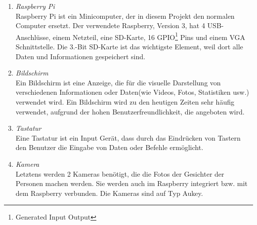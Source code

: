 \begin{enumerate}
	\item \textit{Raspberry Pi} \\
	Raspberry Pi ist ein Minicomputer, der in diesem Projekt den normalen Computer ersetzt. Der verwendete Raspberry, Version 3, hat 4 USB-Anschlüsse, einem Netzteil, eine SD-Karte, 16 GPIO\footnote{Generated Input Output} Pins und einem VGA Schnittstelle. Die 3.-Bit SD-Karte ist das wichtigste Element, weil dort alle Daten und Informationen gespeichert sind.
	\item \textit{Bildschirm} \\
	Ein Bildschirm ist eine Anzeige, die für die visuelle Darstellung von verschiedenen Informationen oder Daten(wie Videos, Fotos, Statistiken usw.) verwendet wird. Ein Bildschirm wird zu den heutigen Zeiten sehr häufig verwendet, aufgrund der hohen Benutzerfreundlichkeit, die angeboten wird.
	\item \textit{Tastatur} \\
	Eine Tastatur ist ein Input Gerät, dass durch das Eindrücken von Tastern den Benutzer die Eingabe von Daten oder Befehle ermöglicht.
	\item \textit{Kamera} \\
	Letztens werden 2 Kameras benötigt, die die Fotos der Gesichter der Personen machen werden. Sie werden auch im Raspberry integriert bzw. mit dem Raspberry verbunden. Die Kameras sind auf Typ Aukey.
\end{enumerate}
